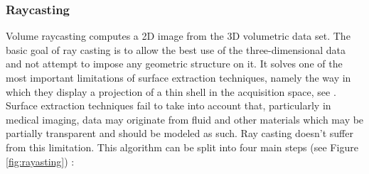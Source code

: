 \subsubsection{Raycasting}
Volume raycasting computes a 2D image from the 3D volumetric data set. The basic goal of ray casting is to allow the best use of the three-dimensional data and not attempt to impose any geometric structure on it. It solves one of the most important limitations of surface extraction techniques, namely the way in which they display a projection of a thin shell in the acquisition space, see \cite{Stegmaier:2005:SFV:2386472.2386498}. Surface extraction techniques fail to take into account that, particularly in medical imaging, data may originate from fluid and other materials which may be partially transparent and should be modeled as such. Ray casting doesn't suffer from this limitation. This algorithm can be split into four main steps (see Figure \ref{fig:rayasting}) :
